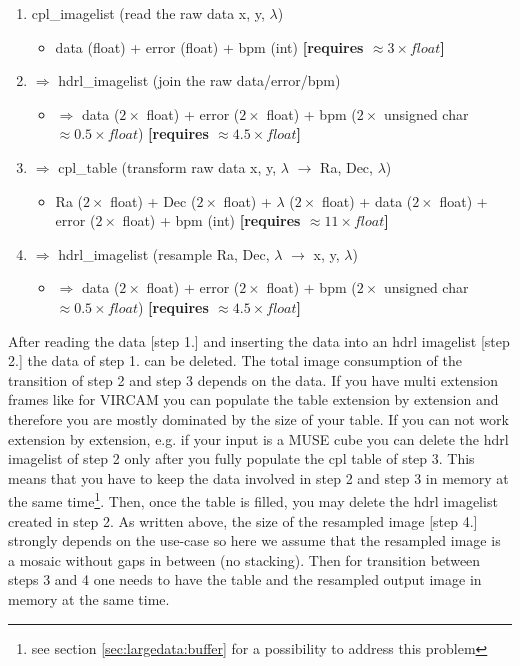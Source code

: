 \begin{enumerate}
\item cpl\_imagelist (read the raw data x, y, $\lambda$)
\begin{itemize}
\item data (float) + error (float) + bpm (int) \textbf{[requires $\approx 3 \times float$]}
\end{itemize}
\item $\Rightarrow$ hdrl\_imagelist (join the raw data/error/bpm)
\begin{itemize}
\item $\Rightarrow$ data ($2\times$ float) + error ($2\times$ float) + bpm
($2\times$ unsigned char $\approx 0.5 \times float$) \textbf{[requires $\approx 4.5 \times float$]}
\end{itemize}
\item $\Rightarrow$ cpl\_table (transform raw data x, y, $\lambda$ $\rightarrow$
Ra, Dec, $\lambda$)
\begin{itemize}
\item Ra ($2\times$ float) + Dec ($2\times$ float) + $\lambda$ ($2\times$ float) + data ($2\times$ float) + error ($2\times$ float) + bpm (int)  \textbf{[requires $\approx 11 \times float$]}
\end{itemize}
\item $\Rightarrow$ hdrl\_imagelist (resample Ra, Dec, $\lambda$  $\rightarrow$ x, y, $\lambda$)
\begin{itemize}
\item $\Rightarrow$ data ($2\times$ float) + error ($2\times$ float) + bpm
($2\times$ unsigned char $\approx 0.5 \times float$) \textbf{[requires $\approx 4.5 \times float$]}
\end{itemize}
\end{enumerate}

After reading the data [step 1.] and inserting the data into an hdrl imagelist
[step 2.] the data of step 1. can be deleted. The total image consumption of the
transition of step 2 and step 3 depends on the data. If you have multi extension
frames like for VIRCAM you can populate the table extension by extension and
therefore you are mostly dominated by the size of your table. If you can not
work extension by extension, e.g. if your input is a MUSE cube you can delete
the hdrl imagelist of step 2 only after you fully populate the cpl table of
step 3. This means that you have to keep the data involved in step 2 and
step 3 in memory at the same time\footnote{see section
\ref{sec:largedata:buffer} for a possibility to
address this problem}. Then, once the table is filled, you may delete the hdrl
imagelist created in step 2. As written above, the size of the resampled image [step 4.]
strongly depends on the use-case so here we assume that the resampled image is a
mosaic without gaps in between (no stacking). Then for transition between
steps 3 and 4 one needs to have the table and the resampled output image in
memory at the same time.

